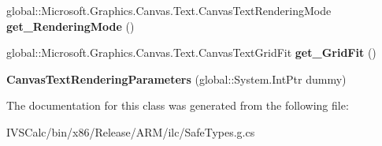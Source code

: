 \begin{DoxyCompactItemize}
\item 
\mbox{\label{class_microsoft_1_1_graphics_1_1_canvas_1_1_text_1_1_canvas_text_rendering_parameters_ac81e7f0df5d66bcb7ea9834f1b82dbfe}} 
global\+::\+Microsoft.\+Graphics.\+Canvas.\+Text.\+Canvas\+Text\+Rendering\+Mode {\bfseries get\+\_\+\+Rendering\+Mode} ()
\item 
\mbox{\label{class_microsoft_1_1_graphics_1_1_canvas_1_1_text_1_1_canvas_text_rendering_parameters_aa1458117209938acb439e48a1b9840d1}} 
global\+::\+Microsoft.\+Graphics.\+Canvas.\+Text.\+Canvas\+Text\+Grid\+Fit {\bfseries get\+\_\+\+Grid\+Fit} ()
\item 
\mbox{\label{class_microsoft_1_1_graphics_1_1_canvas_1_1_text_1_1_canvas_text_rendering_parameters_a808dd2cd44ae8871c788d0f285abb379}} 
{\bfseries Canvas\+Text\+Rendering\+Parameters} (global\+::\+System.\+Int\+Ptr dummy)
\end{DoxyCompactItemize}


The documentation for this class was generated from the following file\+:\begin{DoxyCompactItemize}
\item 
I\+V\+S\+Calc/bin/x86/\+Release/\+A\+R\+M/ilc/Safe\+Types.\+g.\+cs\end{DoxyCompactItemize}
